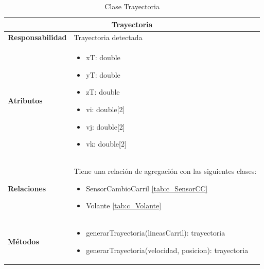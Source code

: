 \begin{table}[H]
\begin{center}
\begin{tabular}{p{} p{11cm}}
\multicolumn{2}{c}{\textbf{Trayectoria} } \\ \hline \hline
\textbf{Responsabilidad} &  Trayectoria detectada\\ \hline
\textbf{Atributos} &  \begin{itemize}
                        \item xT: double
                        \item yT: double
                        \item zT: double
                        \item vi: double[2]
                        \item vj: double[2]
                        \item vk: double[2]
                      \end{itemize}
                      \\ \hline
\textbf{Relaciones} & \par Tiene una relación de agregación con las siguientes clases:
                      \begin{itemize}
                        \item SensorCambioCarril \ref{tab:c_SensorCC}
                        \item Volante \ref{tab:c_Volante}
                      \end{itemize}
                      \\ \hline

\textbf{Métodos} &  \begin{itemize}
                      \item generarTrayectoria(lineasCarril): trayectoria
                      \item generarTrayectoria(velocidad, posicion): trayectoria
                    \end{itemize}\\ \hline
\end{tabular}
\caption{Clase Trayectoria}
\label{tab:c_trayectoria}
\end{center}
\end{table}









